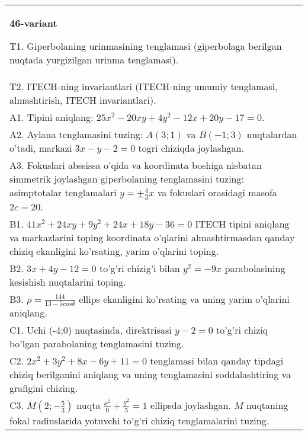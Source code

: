 \documentclass{article}
\begin{document}
\begin{tabular}{m{17cm}}
\textbf{46-variant}
\newline

T1. Giperbolaning urinmasining tenglamasi (giperbolaga berilgan nuqtada yurgizilgan urinma tenglamasi).\\

T2. ITECH-ning invariantlari (ITECH-ning umumiy tenglamasi, almashtirish, ITECH invariantlari).\\

A1. Tipini aniqlang: $25x^{2}-20xy+4y^{2}-12x+20y-17=0$.\\

A2. Aylana tenglamasini tuzing: $A(3;1)$ va $B(-1;3)$ nuqtalardan o'tadi, markazi $3x-y-2=0$ togri chiziqda joylashgan.\\

A3. Fokuslari abssissa o'qida va koordinata boshiga nisbatan simmetrik joylashgan giperbolaning tenglamasini tuzing: asimptotalar tenglamalari $y=\pm \frac{4}{3}x$ va fokuslari orasidagi masofa $2c=20$.\\

B1. $41x^{2} + 24xy + 9y^{2} + 24x + 18y - 36 = 0$ ITECH tipini aniqlang va markazlarini toping koordinata o'qlarini almashtirmasdan qanday chiziq ekanligini ko'rsating, yarim o'qlarini toping.  \\

B2. $3x + 4y - 12 = 0$ to'g'ri chizig'i bilan $y^{2} = - 9x$ parabolasining kesishish nuqtalarini toping.  \\

B3. $\rho = \frac{144}{13 - 5cos\theta}$ ellips ekanligini ko'rsating va uning yarim o'qlarini aniqlang.\\

C1. Uchi (-4;0) nuqtasinda, direktrisasi $y - 2 = 0$ to'g'ri chiziq bo'lgan parabolaning tenglamasini tuzing.\\

C2. $2x^{2} + 3y^{2} + 8x - 6y + 11 = 0$ tenglamasi bilan qanday tipdagi chiziq berilganini aniqlang va uning tenglamasini soddalashtiring va grafigini chizing.  \\

C3. $M(2; - \frac{5}{3})$ nuqta $\frac{x^{2}}{9} + \frac{y^{2}}{5} = 1$ ellipsda joylashgan. $M$ nuqtaning fokal radiuslarida yotuvchi to'g'ri chiziq tenglamalarini tuzing.  \\

\end{tabular}
\vspace{1cm}
\end{document}
